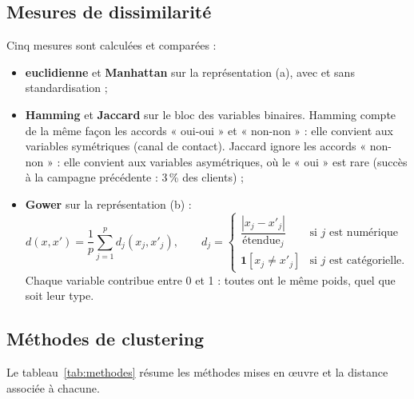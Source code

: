 \documentclass[11pt,a4paper]{article}
\begin{document}
\subsection{Mesures de dissimilarité}
Cinq mesures sont calculées et comparées :
\begin{itemize}
\item \textbf{euclidienne} et \textbf{Manhattan} sur la représentation (a), avec et sans standardisation ;
\item \textbf{Hamming} et \textbf{Jaccard} sur le bloc des variables binaires. Hamming compte de la même façon les accords « oui-oui » et « non-non » : elle convient aux variables symétriques (canal de contact). Jaccard ignore les accords « non-non » : elle convient aux variables asymétriques, où le « oui » est rare (succès à la campagne précédente : 3\,\% des clients) ;
\item \textbf{Gower} sur la représentation (b) :
\[
d(x,x') = \frac{1}{p}\sum_{j=1}^{p} d_j(x_j,x'_j),\qquad
d_j=\begin{cases}\dfrac{|x_j-x'_j|}{\text{étendue}_j} & \text{si $j$ est numérique}\\[8pt] \mathbf{1}[x_j\neq x'_j] & \text{si $j$ est catégorielle.}\end{cases}
\]
Chaque variable contribue entre 0 et 1 : toutes ont le même poids, quel que soit leur type.
\end{itemize}

\subsection{Méthodes de clustering}
Le tableau~\ref{tab:methodes} résume les méthodes mises en œuvre et la distance associée à chacune.
\end{document}
